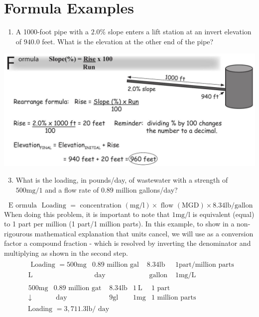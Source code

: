 \documentclass[10pt]{article}
\begin{document}
\section{Formula Examples}
\begin{enumerate}
  \item A 1000-foot pipe with a $2.0 \%$ slope enters a lift station at an invert elevation of $940.0$ feet. What is the elevation at the other end of the pipe?
\end{enumerate}
\includegraphics[max width=\textwidth]{2022_09_16_4d34b76b97ee13a67df7g-11}

\begin{enumerate}
  \setcounter{enumi}{2}
  \item What is the loading, in pounds/day, of wastewater with a strength of $500 \mathrm{mg} / 1$ and a flow rate of $0.89$ million gallons/day?
\end{enumerate}
$$
\text { E ormula } \text { Loading }=\text { concentration }(\mathrm{mg} / \mathrm{l}) \times \text { flow }(\mathrm{MGD}) \times 8.34 \mathrm{lb} / \mathrm{gallon}
$$
When doing this problem, it is important to note that $1 \mathrm{mg} / \mathrm{l}$ is equivalent (equal) to 1 part per million (1 part/1 million parts). In this example, to show in a non-rigourous mathematical explanation that units cancel, we will use as a conversion factor a compound fraction - which is resolved by inverting the denominator and multiplying as shown in the second step.
$$
\begin{aligned}
& \begin{array}{c|c|c|c}\text { Loading }=500 \mathrm{mg} & 0.89 \text { million gal } & 8.34 \mathrm{lb} & 1 \mathrm{part} / \mathrm{million} \text { parts } \\\hline \mathrm{L} & \text { day } & \text { gallon } & 1 \mathrm{mg} / \mathrm{L}\end{array} \\
& \begin{array}{c|c|c|c|c}500 \mathrm{mg} & 0.89 \text { million gat } & 8.34 \mathrm{lb} & 1 \mathrm{~L} & 1 \text { part } \\\hline \downarrow & \text { day } & 9 \mathrm{gl} & 1 \mathrm{mg} & 1 \text { million parts }\end{array} \\
& \text { Loading }=3,711.3 \mathrm{lb} / \text { day } 
\end{aligned}
$$
\end{document}

